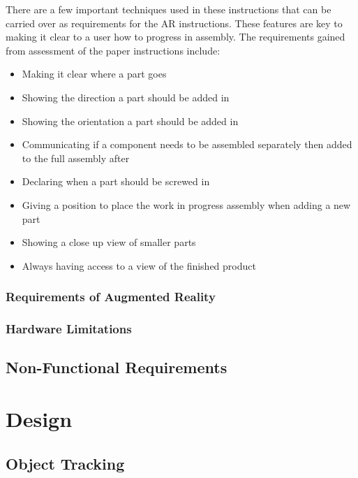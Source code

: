 \documentclass{l4proj}
\begin{document}
There are a few important techniques used in these instructions that can be carried over as requirements for the AR instructions. These features are key to making it clear to a user how to progress in assembly. The requirements gained from assessment of the paper instructions include:

\begin{itemize}
    \item Making it clear where a part goes
    \item Showing the direction a part should be added in
    \item Showing the orientation a part should be added in
    \item Communicating if a component needs to be assembled separately then added to the full assembly after
    \item Declaring when a part should be screwed in
    \item Giving a position to place the work in progress assembly when adding a new part
    \item Showing a close up view of smaller parts
    \item Always having access to a view of the finished product
\end{itemize}

\subsection{Requirements of Augmented Reality}

\subsection{Hardware Limitations}



\section{Non-Functional Requirements}


\chapter{Design}

\section{Object Tracking}
\end{document}
